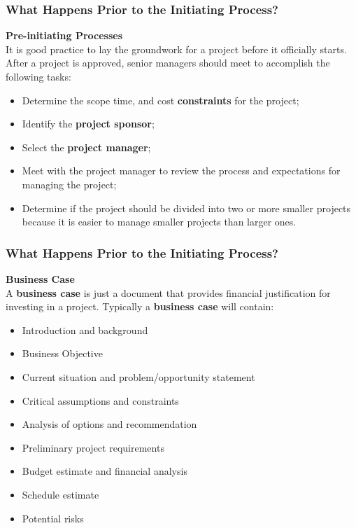 \documentclass{beamer}
\begin{document}
\begin{frame}
\frametitle{What Happens Prior to the Initiating Process?}
\textbf{Pre-initiating Processes}\\
\vspace{0.5cm}
It is good practice to lay the groundwork for a project before it officially starts. After a project is approved, senior managers should meet to accomplish the following tasks:
\vspace{0.5cm}
\begin{itemize}
\item Determine the scope time, and cost \textbf{constraints} for the project;
\item Identify the \textbf{project sponsor};
\item Select the \textbf{project manager};
\item Meet with the project manager to review the process and expectations for managing the project;
\item Determine if the project should be divided into two or more smaller projects because it is easier to manage smaller projects than larger ones.
\end{itemize}
\end{frame}

\begin{frame}
\frametitle{What Happens Prior to the Initiating Process?}
\textbf{Business Case}\\
\vspace{0.5cm}
A \textbf{business case} is just a document that provides financial justification for investing in a project. Typically a \textbf{business case} will contain:
\begin{itemize}
\item Introduction and background
\item Business Objective
\item Current situation and problem/opportunity statement
\item Critical assumptions and constraints
\item Analysis of options and recommendation
\item Preliminary project requirements
\item Budget estimate and financial analysis
\item Schedule estimate
\item Potential risks
\end{itemize}
\end{frame}
\end{document}
